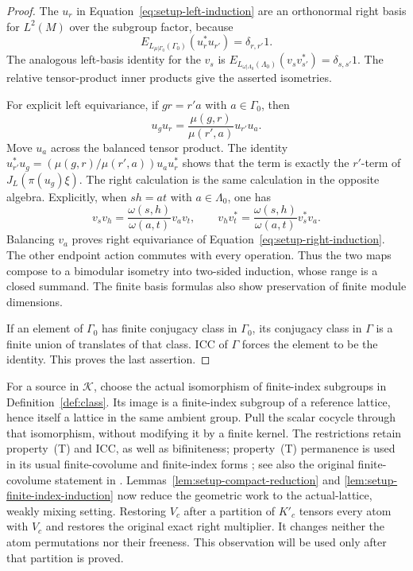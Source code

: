 \begin{proof}
The $u_r$ in Equation~\eqref{eq:setup-left-induction} are an
orthonormal right basis for $L^2(M)$ over the subgroup factor, because
\[
 E_{L_{\mu|\Gamma_0}(\Gamma_0)}(u_r^*u_{r'})
   =\delta_{r,r'}1.
\]
The analogous left-basis identity for the $v_s$ is
$E_{L_{\omega|\Lambda_0}(\Lambda_0)}(v_sv_{s'}^*)
=\delta_{s,s'}1$.  The relative tensor-product inner products give
the asserted isometries.

For explicit left equivariance, if $gr=r'a$ with $a\in\Gamma_0$,
then
\[
 u_gu_r=\frac{\mu(g,r)}{\mu(r',a)}u_{r'}u_a.
\]
Move $u_a$ across the balanced tensor product.  The identity
$u_{r'}^*u_g=(\mu(g,r)/\mu(r',a))u_au_r^*$ shows that the term is
exactly the $r'$-term of $J_L(\pi(u_g)\xi)$.  The right calculation
is the same calculation in the opposite algebra.  Explicitly, when
$sh=at$ with $a\in\Lambda_0$, one has
\[
 v_sv_h=\frac{\omega(s,h)}{\omega(a,t)}v_av_t,
 \qquad
 v_hv_t^*=\frac{\omega(s,h)}{\omega(a,t)}v_s^*v_a.
\]
Balancing $v_a$ proves right equivariance of
Equation~\eqref{eq:setup-right-induction}.  The other endpoint action
commutes with every operation.  Thus the two maps compose to a
bimodular isometry into two-sided induction, whose range is a closed
summand.  The finite basis formulas also show preservation of finite
module dimensions.

If an element of $\Gamma_0$ has finite conjugacy class in
$\Gamma_0$, its conjugacy class in $\Gamma$ is a finite union of
translates of that class.  ICC of $\Gamma$ forces the element to be
the identity.  This proves the last assertion.
\end{proof}

For a source in $\mathscr K$, choose the actual isomorphism of
finite-index subgroups in Definition~\ref{def:class}.  Its image is
a finite-index subgroup of a reference lattice, hence itself a lattice
in the same ambient group.  Pull the scalar cocycle through that
isomorphism, without modifying it by a finite kernel.  The restrictions
retain property~(T) and ICC, as well as bifiniteness; property~(T)
permanence is used in its usual finite-covolume and finite-index forms
\cite[Theorem~1.7.1]{BHV2008}; see also the original finite-covolume
statement in \cite[Theorem~3]{DelarocheKirillov1968}.  Lemmas~\ref{lem:setup-compact-reduction} and
\ref{lem:setup-finite-index-induction} now reduce the geometric work
to the actual-lattice, weakly mixing setting.  Restoring $V_c$ after a
partition of $K'_c$ tensors every atom with $V_c$ and restores the
original exact right multiplier.  It changes neither the atom
permutations nor their freeness.  This observation will be used only
after that partition is proved.


